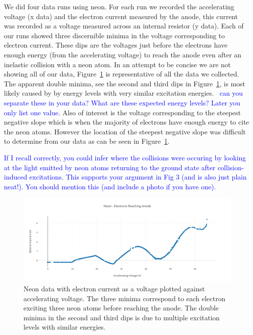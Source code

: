 \documentclass[prb,preprint]{revtex4-1}
\begin{document}
We did four data runs using neon. For each run we recorded the accelerating voltage (x data) and the electron current measured by the anode, this current was recorded as a voltage measured across an internal resistor (y data). Each of our runs showed three discernible minima in the voltage corresponding to electron current. These dips are the voltages just before the electrons have enough energy (from the accelerating voltage) to reach the anode even after an inelastic collision with a neon atom. In an attempt to be concise we are not showing all of our data, Figure~\ref{neon_data} is representative of all the data we collected. The apparent double minima, see the second and third dips in Figure~\ref{neon_data}, is most likely caused by by energy levels with very similar excitation energies.~\cite{newfeatures} \textcolor{blue}{can you separate these in your data? What are these expected energy levels? Later you only list one value}. Also of interest is the voltage corresponding to the steepest negative slope which is when the majority of electrons have enough energy to cite the neon atoms. However the location of the steepest negative slope was difficult to determine from our data as can be seen in Figure~\ref{neon_data}.

\textcolor{blue}{If I recall correctly, you could infer where the collisions were occuring by looking at the light emitted by neon atoms returning to the ground state after collision-induced excitations. This supports your argument in Fig 3 (and is also just plain neat!). You should mention this (and include a photo if you have one).}

\begin{figure}[h!]
\centering

\includegraphics[width=6in]{neon_data.pdf}
\caption{Neon data with electron current as a voltage plotted against accelerating voltage. The three minima correspond to each electron exciting three neon atoms before reaching the anode. The double minima in the second and third dips is due to multiple excitation levels with similar energies.}



\label{neon_data}
\end{figure}
\end{document}

